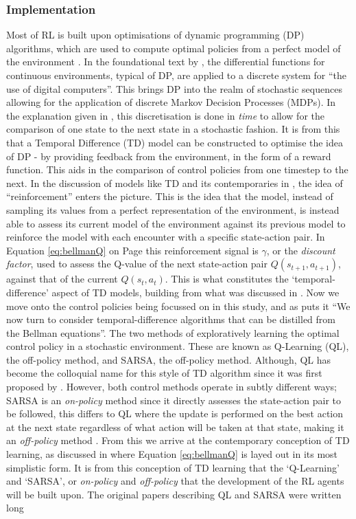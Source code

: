 \documentclass[hidelinks,journal]{IEEEtran}
\begin{document}
\subsubsection{Implementation}
\label{subsubsec:desReqImp}
Most of RL is built upon optimisations of dynamic programming (DP) algorithms, which are used to compute optimal policies from a perfect model of the environment \parencite{Sutton18}. In the foundational text by \textcite{Bellman58}, the differential functions for continuous environments, typical of DP, are applied to a discrete system for “the use of digital computers”. This brings DP into the realm of stochastic sequences allowing for the application of discrete Markov Decision Processes (MDPs). In the explanation given in \textcite[ch 4,p 234]{Bellman58}, this discretisation is done in \emph{time} to allow for the comparison of one state to the next state in a stochastic fashion. It is from this that a Temporal Difference (TD) model can be constructed to optimise the idea of DP - by providing feedback from the environment, in the form of a reward function. This aids in the comparison of control policies from one timestep to the next. In the discussion of models like TD and its contemporaries in \textcite{Sutton87}, the idea of “reinforcement” enters the picture. This is the idea that the model, instead of sampling its values from a perfect representation of the environment, is instead able to assess its current model of the environment against its previous model to reinforce the model with each encounter with a specific state-action pair. In Equation \ref{eq:bellmanQ} on Page \pageref{eq:bellmanQ} this reinforcement signal is $\gamma$, or the \emph{discount factor}, used to assess the Q-value of the next state-action pair $Q(s_{t+1},a_{t+1})$, against that of the current $Q(s_t, a_t)$. This is what constitutes the ‘temporal-difference’ aspect of TD models, building from what was discussed in \textcite{Bellman58}. Now we move onto the control policies being focussed on in this study, and as \textcite{Hasselt11} puts it “We now turn to consider temporal-difference algorithms that can be distilled from the Bellman equations”. The two methods of exploratively learning the optimal control policy in a stochastic environment. These are known as Q-Learning (QL), the off-policy method, and SARSA, the off-policy method. Although, QL has become the colloquial name for this style of TD algorithm since it was first proposed by \textcite{Watkins89}. However, both control methods operate in subtly different ways; SARSA is an \emph{on-policy} method since it directly assesses the state-action pair to be followed, this differs to QL where the update is performed on the best action at the next state regardless of what action will be taken at that state, making it an \emph{off-policy} method \parencite{Hasselt11}. From this we arrive at the contemporary conception of TD learning, as discussed in \textcite{Sutton18} where Equation \ref{eq:bellmanQ} is layed out in its most simplistic form. It is from this conception of TD learning that the ‘Q-Learning’ and ‘SARSA’, or \emph{on-policy} and \emph{off-policy} that the development of the RL agents will be built upon. The original papers describing QL and SARSA were written long 
\end{document}
